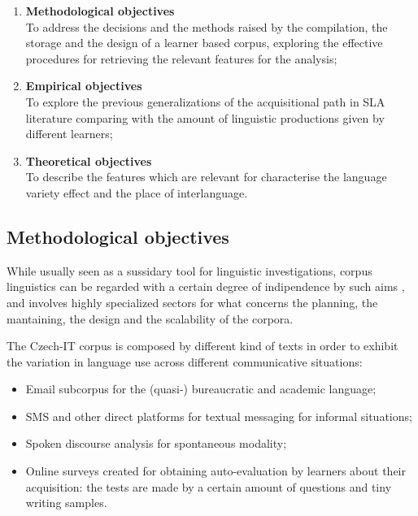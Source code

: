 \documentclass[a4paper,twoside,12pt,chapterprefix=false,bibliography=totocnumbered,listof=flat]{scrbook}
\providecommand{\tightlist}{%
  \setlength{\itemsep}{0pt}\setlength{\parskip}{0pt}}
\begin{document}
\begin{enumerate}
\def\labelenumi{\arabic{enumi}.}
\tightlist
\item
  \textbf{Methodological objectives}\\
  To address the decisions and the methods raised by the compilation,
  the storage and the design of a learner based corpus, exploring the
  effective procedures for retrieving the relevant features for the
  analysis;
\item
  \textbf{Empirical objectives}\\
  To explore the previous generalizations of the acquisitional path in
  SLA literature comparing with the amount of linguistic productions
  given by different learners;
\item
  \textbf{Theoretical objectives}\\
  To describe the features which are relevant for characterise the
  language variety effect and the place of interlanguage.
\end{enumerate}

\subsection{Methodological objectives}\label{methodological-objectives}

While usually seen as a sussidary tool for linguistic investigations,
corpus linguistics can be regarded with a certain degree of indipendence
by such aims \citep{sinclair2005, sinclairCarter2004}, and involves
highly specialized sectors for what concerns the planning, the
mantaining, the design and the scalability of the corpora.

The Czech-IT corpus is composed by different kind of texts in order to
exhibit the variation in language use across different communicative
situations:

\begin{itemize}
\tightlist
\item
  Email subcorpus for the (quasi-) bureaucratic and academic language;
\item
  SMS and other direct platforms for textual messaging for informal
  situations;
\item
  Spoken discourse analysis for spontaneous modality;
\item
  Online surveys created for obtaining auto-evaluation by learners about
  their acquisition: the tests are made by a certain amount of questions
  and tiny writing samples.
\end{itemize}
\end{document}
